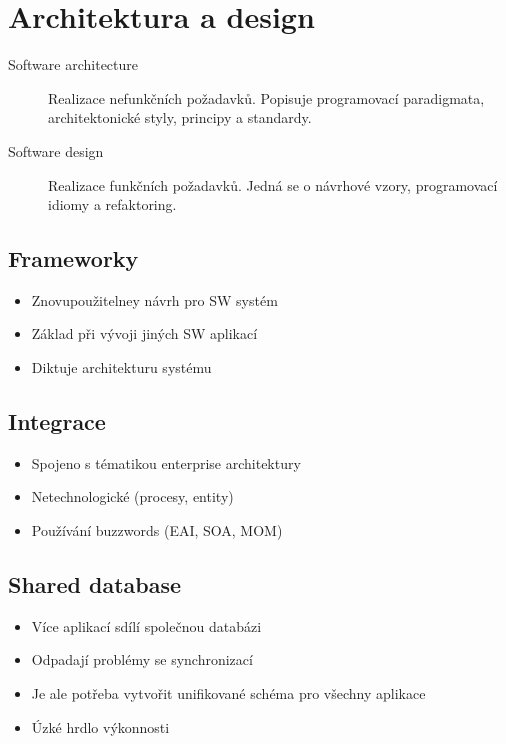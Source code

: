 \section{Architektura a design}
  \begin{description}
    \item[Software architecture] Realizace nefunkčních požadavků. Popisuje programovací paradigmata,
    architektonické styly, principy a standardy.
    \item[Software design] Realizace funkčních požadavků. Jedná se o návrhové vzory, programovací idiomy
    a refaktoring.
  \end{description}

  \subsection{Frameworky}
    \begin{itemize}
      \item Znovupoužitelney návrh pro SW systém
      \item Základ při vývoji jiných SW aplikací
      \item Diktuje architekturu systému
    \end{itemize}

  \subsection{Integrace}
    \begin{itemize}
      \item Spojeno s tématikou enterprise architektury
      \item Netechnologické (procesy, entity)
      \item Používání buzzwords (EAI, SOA, MOM)
    \end{itemize}

  \subsection{Shared database}
    \begin{itemize}
      \item Více aplikací sdílí společnou databázi
      \item Odpadají problémy se synchronizací
      \item Je ale potřeba vytvořit unifikované schéma pro všechny aplikace
      \item Úzké hrdlo výkonnosti
    \end{itemize}

